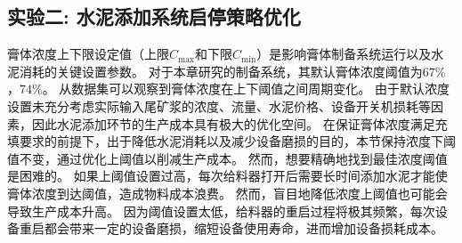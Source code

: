 \subsection{实验二: 水泥添加系统启停策略优化}
\label{sub:case-study2}
膏体浓度上下限设定值（上限$C_{\max}$和下限$C_{\min}$）是影响膏体制备系统运行以及水泥消耗的关键设置参数。
对于本章研究的制备系统，其默认膏体浓度阈值为$67\%$，$74\%$。
从数据集可以观察到膏体浓度在上下阈值之间周期变化。
由于默认浓度设置未充分考虑实际输入尾矿浆的浓度、流量、水泥价格、设备开关机损耗等因素，因此水泥添加环节的生产成本具有极大的优化空间。
在保证膏体浓度满足充填要求的前提下，出于降低水泥消耗以及减少设备磨损的目的，本节保持浓度下阈值不变，通过优化上阈值以削减生产成本。
然而，想要精确地找到最佳浓度阈值是困难的。
如果上阈值设置过高，每次给料器打开后需要长时间添加水泥才能使膏体浓度到达阈值，造成物料成本浪费。
然而，盲目地降低浓度上阈值也可能会导致生产成本升高。
因为阈值设置太低，给料器的重启过程将极其频繁，每次设备重启都会带来一定的设备磨损，缩短设备使用寿命，进而增加设备损耗成本。

